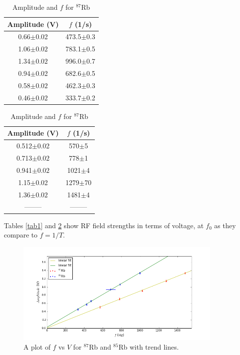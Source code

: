 \documentclass[prb,preprint]{revtex4-1}
\begin{document}
\begin{table}[h!]

\begin{minipage}[b]{70mm}
\caption{Amplitude and $f$ for $^{85}$Rb}
\begin{ruledtabular}
\begin{tabular}{c c}
Amplitude (V) & $f$ (1/s)\\
\hline
0.66$\pm$0.02 & 473.5$\pm$0.3\\
1.06$\pm0.02$ & 783.1$\pm$0.5\\
1.34$\pm0.02$ & 996.0$\pm$0.7\\
0.94$\pm$0.02   & 682.6$\pm$0.5\\
0.58$\pm0.02 $  & 462.3$\pm$0.3\\
0.46$\pm0.02 $  & 333.7$\pm$0.2\\

\end{tabular}
\label{tab1}
\end{ruledtabular}

\end{minipage}
\begin{minipage}[b]{70mm}
\caption{Amplitude and $f$ for $^{87}$Rb}
\begin{ruledtabular}
\begin{tabular}{c c}
Amplitude (V) & $f$ (1/s)\\
\hline
0.512$\pm$0.02 & 570$\pm$5\\
0.713$\pm0.02$ & 778$\pm$1\\
0.941$\pm0.02$ & 1021$\pm$4\\
1.15$\pm$0.02   & 1279$\pm$70\\
1.36$\pm0.02 $  & 1481$\pm$4\\
--------  & --------\\
\end{tabular}
\end{ruledtabular}
\label{tab2}
\end{minipage}

{Tables \ref{tab1} and \ref{tab2} show RF field strengths in terms of voltage, at $f_0$ as they compare to $f=1/T$.}
\end{table}

\begin{figure}[h!]
\centering
\includegraphics[width=0.9\textwidth]{ratios.png}
\caption{A plot of $f$ vs $V$ for $^{87}$Rb and $^{85}$Rb with trend lines.}
\label{ratio}
\end{figure}
\end{document}

